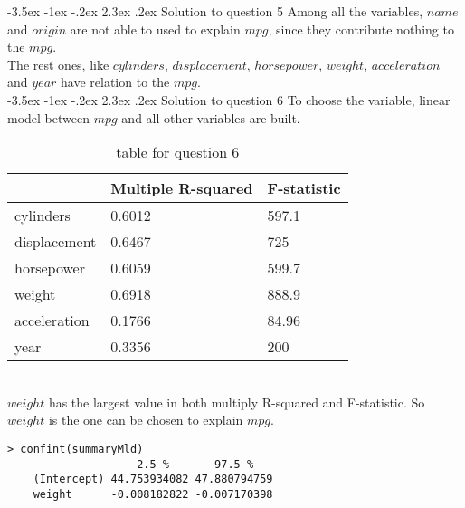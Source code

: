 \documentclass[12pt]{article}
\makeatletter
\renewcommand\section{\@startsection {section}{1}{\z@}%
	{-3.5ex \@plus -1ex \@minus -.2ex}%
	{2.3ex \@plus.2ex}%
	{\normalfont\large\bfseries}}%
\makeatother
\begin{document}
	\section{Solution to question 5}
	Among all the variables, $name$ and $origin$ are not able to used to explain $mpg$, since they contribute nothing to the $mpg$.\\
	The rest ones, like $cylinders$, $displacement$, $horsepower$, $weight$, $acceleration$ and $year$ have relation to the $mpg$.\\
	\section{Solution to question 6}
	To choose the variable, linear model between $mpg$ and all other variables are built.
	\begin{table}[htbp]
		\centering
		\caption{table for question 6}
		\label{q3_table}
		\begin{tabular}{|l|l|l|}
			\hline
			             & Multiple R-squared & F-statistic\\
			\hline
			cylinders    & 0.6012             & 597.1 \\
			\hline
			displacement & 0.6467             & 725 \\
			\hline
			horsepower   & 0.6059             & 599.7 \\
			\hline
			weight       & 0.6918             & 888.9 \\
			\hline
			acceleration & 0.1766             & 84.96 \\
			\hline
			year         & 0.3356             & 200 \\
			\hline
		\end{tabular}
	\end{table}
	\noindent
	\\
	$weight$ has the largest value in both multiply R-squared and F-statistic. So $weight$ is the one can be chosen to explain $mpg$.\\
	\lstset{language=R}
	\lstset{frame=lines}
	\lstset{basicstyle=\footnotesize\ttfamily}
	\begin{lstlisting}[breaklines=true]
	> confint(summaryMld)
	                2.5 %       97.5 %
	(Intercept) 44.753934082 47.880794759
	weight      -0.008182822 -0.007170398
	\end{lstlisting}
\end{document}
